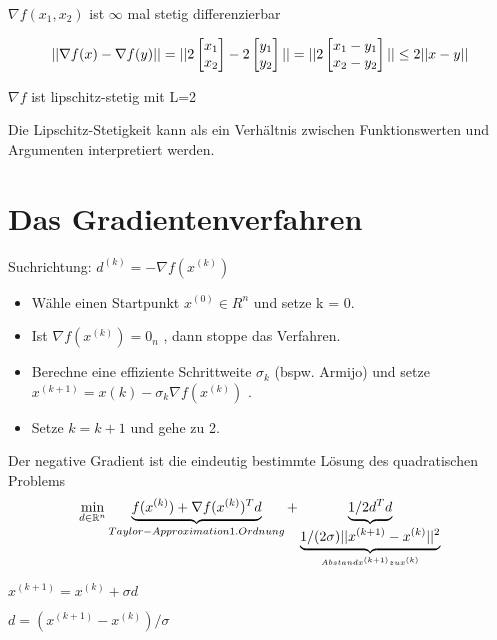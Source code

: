 $\nabla f(x_1,x_2)$ ist $\infty$ mal stetig differenzierbar

\begin{equation}
|| \nabla f(x) - \nabla f(y) || = || 2 \begin{bmatrix}x_1\\x_2\end{bmatrix} -2 \begin{bmatrix}y_1\\y_2\end{bmatrix} ||\\
= ||2 \begin{bmatrix}x_1 -y_1\\x_2 - y_2\end{bmatrix} ||\\
\leq 2 ||x-y||
\end{equation}

$\nabla f$ ist lipschitz-stetig mit L=2

Die Lipschitz-Stetigkeit kann als ein Verhältnis zwischen Funktionswerten und Argumenten interpretiert werden.

\section{Das Gradientenverfahren}

Suchrichtung: $d^{(k)} = -\nabla f(x^{(k)})$
\begin{itemize}
	\item Wähle einen Startpunkt $x^{(0)} \in R^n$ und setze k = 0.
	\item Ist $\nabla f(x^{(k)}) = 0_n$ , dann stoppe das Verfahren.
	\item Berechne eine effiziente Schrittweite $\sigma_k$ (bspw. Armijo) und setze
	$x^{(k+1)} = x{(k)} - \sigma_k \nabla f(x^{(k)})$ .
	\item Setze $k = k + 1$ und gehe zu 2.
\end{itemize}

Der negative Gradient ist die eindeutig bestimmte Lösung des quadratischen Problems
\begin{equation}
	\min_{d\in\mathbb R^n} \underbrace{f(x^{(k)}) + \nabla f(x^{(k)})^Td}_{Taylor-Approximation 1. Ordnung} + \underbrace{1/2 d^Td}_{\underbrace{1/(2\sigma)||x^{(k+1)} - x^{(k)}||^2}_{Abstand x^{(k+1)} zu x^{(k)}}}
\end{equation}
	
$x^{(k+1)} = x^{(k)} + \sigma d$
	
$d = (x^{(k+1)}-x^{(k)})/\sigma$
	
